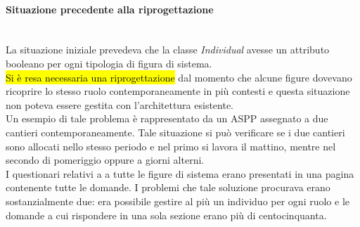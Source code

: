 	\paragraph*{Situazione precedente alla riprogettazione} \mbox{} \\
	
	La situazione iniziale prevedeva che la classe \textit{Individual} avesse  un attributo booleano per ogni tipologia di figura di sistema. \\
	\hl{Si è resa necessaria una riprogettazione} dal momento che alcune figure dovevano ricoprire lo stesso ruolo contemporaneamente in più contesti e questa situazione non poteva essere gestita con l'architettura esistente. \\
	Un esempio di tale problema è rappresentato da un ASPP assegnato a due cantieri contemporaneamente. Tale situazione si può verificare se i due cantieri sono allocati nello stesso periodo e nel primo si lavora il mattino, mentre nel secondo di pomeriggio oppure a giorni alterni.\\
	I questionari relativi a a tutte le figure di sistema erano presentati in una pagina contenente tutte le domande. I problemi che tale soluzione procurava erano sostanzialmente due: era possibile gestire al più un individuo per ogni ruolo e le domande a cui rispondere in una sola sezione erano più di centocinquanta.

